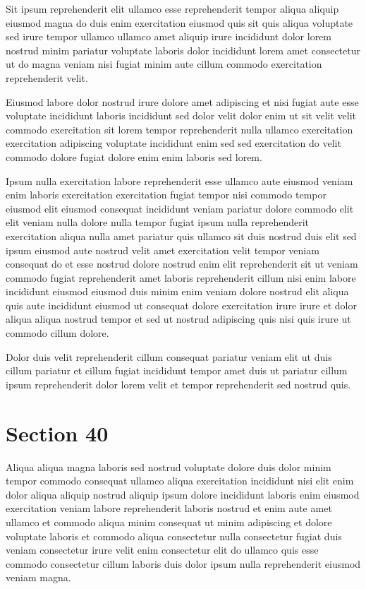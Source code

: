 \documentclass{article}
\begin{document}
Sit ipsum reprehenderit elit ullamco esse reprehenderit tempor aliqua aliquip eiusmod magna do duis enim exercitation eiusmod quis sit quis aliqua voluptate sed irure tempor ullamco ullamco amet aliquip irure incididunt dolor lorem nostrud minim pariatur voluptate laboris dolor incididunt lorem amet consectetur ut do magna veniam nisi fugiat minim aute cillum commodo exercitation reprehenderit velit.

Eiusmod labore dolor nostrud irure dolore amet adipiscing et nisi fugiat aute esse voluptate incididunt laboris incididunt sed dolor velit dolor enim ut sit velit velit commodo exercitation sit lorem tempor reprehenderit nulla ullamco exercitation exercitation adipiscing voluptate incididunt enim sed sed exercitation do velit commodo dolore fugiat dolore enim enim laboris sed lorem.

Ipsum nulla exercitation labore reprehenderit esse ullamco aute eiusmod veniam enim laboris exercitation exercitation fugiat tempor nisi commodo tempor eiusmod elit eiusmod consequat incididunt veniam pariatur dolore commodo elit elit veniam nulla dolore nulla tempor fugiat ipsum nulla reprehenderit exercitation aliqua nulla amet pariatur quis ullamco sit duis nostrud duis elit sed ipsum eiusmod aute nostrud velit amet exercitation velit tempor veniam consequat do et esse nostrud dolore nostrud enim elit reprehenderit sit ut veniam commodo fugiat reprehenderit amet laboris reprehenderit cillum nisi enim labore incididunt eiusmod eiusmod duis minim enim veniam dolore nostrud elit aliqua quis aute incididunt eiusmod ut consequat dolore exercitation irure irure et dolor aliqua aliqua nostrud tempor et sed ut nostrud adipiscing quis nisi quis irure ut commodo cillum dolore.

Dolor duis velit reprehenderit cillum consequat pariatur veniam elit ut duis cillum pariatur et cillum fugiat incididunt tempor amet duis ut pariatur cillum ipsum reprehenderit dolor lorem velit et tempor reprehenderit sed nostrud quis.

\section{Section 40}
Aliqua aliqua magna laboris sed nostrud voluptate dolore duis dolor minim tempor commodo consequat ullamco aliqua exercitation incididunt nisi elit enim dolor aliqua aliquip nostrud aliquip ipsum dolore incididunt laboris enim eiusmod exercitation veniam labore reprehenderit laboris nostrud et enim aute amet ullamco et commodo aliqua minim consequat ut minim adipiscing et dolore voluptate laboris et commodo aliqua consectetur nulla consectetur fugiat duis veniam consectetur irure velit enim consectetur elit do ullamco quis esse commodo consectetur cillum laboris duis dolor ipsum nulla reprehenderit eiusmod veniam magna.
\end{document}

